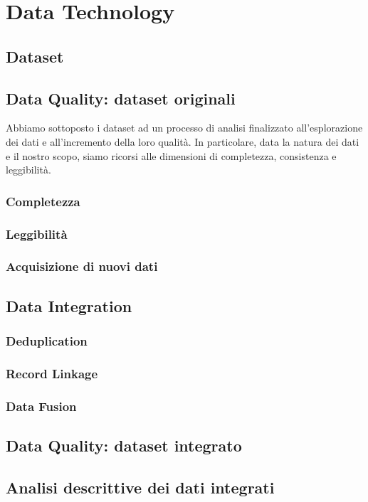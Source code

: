 \setcounter{chapter}{0}

\part{Data Technology}

\chapter{Dataset}

\chapter{Data Quality: dataset originali}
\label{chap:data-quality}
Abbiamo sottoposto i dataset ad un processo di analisi finalizzato 
all'esplorazione dei dati e all'incremento della loro qualità. In particolare, 
data la natura dei dati e il nostro scopo, siamo ricorsi alle dimensioni di 
completezza, consistenza e leggibilità.


\section{Completezza}

\section{Leggibilità}

\section{Acquisizione di nuovi dati}

\chapter{Data Integration}
\label{chap:data-integration}

\section{Deduplication}

\section{Record Linkage}
\label{sec:record-linkage}

\section{Data Fusion}
\label{sec:data-fusion}

\chapter{Data Quality: dataset integrato}

\chapter{Analisi descrittive dei dati integrati}
